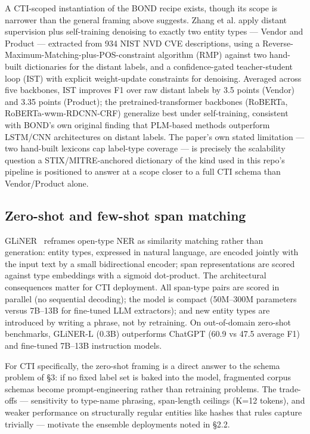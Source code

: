 \documentclass[11pt]{article}
\begin{document}
A CTI-scoped instantiation of the BOND recipe exists, though its scope is narrower than the general framing above suggests. Zhang et al. apply distant supervision plus self-training denoising to exactly two entity types — Vendor and Product — extracted from 934 NIST NVD CVE descriptions, using a Reverse-Maximum-Matching-plus-POS-constraint algorithm (RMP) against two hand-built dictionaries for the distant labels, and a confidence-gated teacher-student loop (IST) with explicit weight-update constraints for denoising. Averaged across five backbones, IST improves F1 over raw distant labels by 3.5 points (Vendor) and 3.35 points (Product); the pretrained-transformer backbones (RoBERTa, RoBERTa-wwm-RDCNN-CRF) generalize best under self-training, consistent with BOND's own original finding that PLM-based methods outperform LSTM/CNN architectures on distant labels. The paper's own stated limitation — two hand-built lexicons cap label-type coverage — is precisely the scalability question a STIX/MITRE-anchored dictionary of the kind used in this repo's pipeline is positioned to answer at a scope closer to a full CTI schema than Vendor/Product alone.

\subsection{Zero-shot and few-shot span matching}

GLiNER~\citep{zaratiana2023gliner} reframes open-type NER as similarity matching rather than generation: entity types, expressed in natural language, are encoded jointly with the input text by a small bidirectional encoder; span representations are scored against type embeddings with a sigmoid dot-product. The architectural consequences matter for CTI deployment. All span-type pairs are scored in parallel (no sequential decoding); the model is compact (50M–300M parameters versus 7B–13B for fine-tuned LLM extractors); and new entity types are introduced by writing a phrase, not by retraining. On out-of-domain zero-shot benchmarks, GLiNER-L (0.3B) outperforms ChatGPT (60.9 vs 47.5 average F1) and fine-tuned 7B–13B instruction models.

For CTI specifically, the zero-shot framing is a direct answer to the schema problem of §3: if no fixed label set is baked into the model, fragmented corpus schemas become prompt-engineering rather than retraining problems. The trade-offs — sensitivity to type-name phrasing, span-length ceilings (K=12 tokens), and weaker performance on structurally regular entities like hashes that rules capture trivially — motivate the ensemble deployments noted in §2.2.
\end{document}
